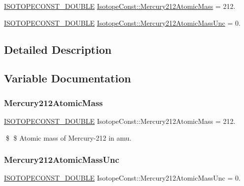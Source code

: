 \begin{DoxyCompactItemize}
\item 
\mbox{\hyperlink{group___isotope_const-_macros_ga8f45a7272ce02c0b4c65c44636ed719a}{I\+S\+O\+T\+O\+P\+E\+C\+O\+N\+S\+T\+\_\+\+D\+O\+U\+B\+LE}} \mbox{\hyperlink{group___isotope_const-_mercury-_hg212_gaaa9b534942402c1f05266f92388e65e9}{Isotope\+Const\+::\+Mercury212\+Atomic\+Mass}} = 212.
\item 
\mbox{\hyperlink{group___isotope_const-_macros_ga8f45a7272ce02c0b4c65c44636ed719a}{I\+S\+O\+T\+O\+P\+E\+C\+O\+N\+S\+T\+\_\+\+D\+O\+U\+B\+LE}} \mbox{\hyperlink{group___isotope_const-_mercury-_hg212_gad84e2e77f4946e099ec92d66b4c603dc}{Isotope\+Const\+::\+Mercury212\+Atomic\+Mass\+Unc}} = 0.
\end{DoxyCompactItemize}


\subsection{Detailed Description}


\subsection{Variable Documentation}
\mbox{\label{group___isotope_const-_mercury-_hg212_gaaa9b534942402c1f05266f92388e65e9}} 
\subsubsection{\texorpdfstring{Mercury212\+Atomic\+Mass}{Mercury212AtomicMass}}
{\footnotesize\ttfamily \mbox{\hyperlink{group___isotope_const-_macros_ga8f45a7272ce02c0b4c65c44636ed719a}{I\+S\+O\+T\+O\+P\+E\+C\+O\+N\+S\+T\+\_\+\+D\+O\+U\+B\+LE}} Isotope\+Const\+::\+Mercury212\+Atomic\+Mass = 212.}

\$ \$ Atomic mass of Mercury-\/212 in amu. \mbox{\label{group___isotope_const-_mercury-_hg212_gad84e2e77f4946e099ec92d66b4c603dc}} 
\subsubsection{\texorpdfstring{Mercury212\+Atomic\+Mass\+Unc}{Mercury212AtomicMassUnc}}
{\footnotesize\ttfamily \mbox{\hyperlink{group___isotope_const-_macros_ga8f45a7272ce02c0b4c65c44636ed719a}{I\+S\+O\+T\+O\+P\+E\+C\+O\+N\+S\+T\+\_\+\+D\+O\+U\+B\+LE}} Isotope\+Const\+::\+Mercury212\+Atomic\+Mass\+Unc = 0.}

